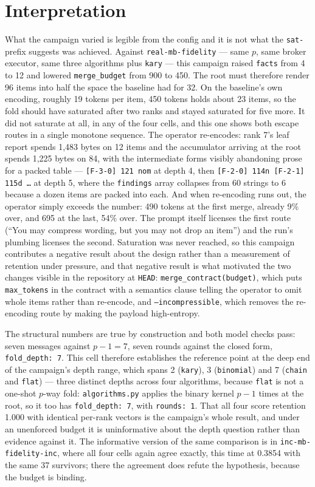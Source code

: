 \documentclass[11pt]{article}
\begin{document}
\section{Interpretation}

What the campaign varied is legible from the config and it is not what the \texttt{sat-}
prefix suggests was achieved. Against \texttt{real-mb-fidelity} --- same $p$, same broker
executor, same three algorithms plus \texttt{kary} --- this campaign raised \texttt{facts}
from 4 to 12 and lowered \texttt{merge\_budget} from 900 to 450. The root must therefore
render 96 items into half the space the baseline had for 32. On the baseline's own
encoding, roughly 19 tokens per item, 450 tokens holds about 23 items, so the fold should
have saturated after two ranks and stayed saturated for five more. It did not saturate at
all, in any of the four cells, and this one shows both escape routes in a single monotone
sequence. The operator re-encodes: rank 7's leaf report spends 1{,}483 bytes on 12 items
and the accumulator arriving at the root spends 1{,}225 bytes on 84, with the intermediate
forms visibly abandoning prose for a packed table --- \texttt{[F-3-0] 121 nom} at depth 4,
then \texttt{[F-2-0] 114n [F-2-1] 115d \dots} at depth 5, where the \texttt{findings} array
collapses from 60 strings to 6 because a dozen items are packed into each. And when
re-encoding runs out, the operator simply exceeds the number: 490 tokens at the first
merge, already 9\% over, and 695 at the last, 54\% over. The prompt itself licenses the
first route (``You may compress wording, but you may not drop an item'') and the run's
plumbing licenses the second. Saturation was never reached, so this campaign contributes a
negative result about the design rather than a measurement of retention under pressure, and
that negative result is what motivated the two changes visible in the repository at
\texttt{HEAD}: \texttt{merge\_contract(budget)}, which puts \texttt{max\_tokens} in the
contract with a semantics clause telling the operator to omit whole items rather than
re-encode, and \texttt{--incompressible}, which removes the re-encoding route by making the
payload high-entropy.

The structural numbers are true by construction and both model checks pass: seven messages
against $p-1 = 7$, seven rounds against the closed form, \texttt{fold\_depth: 7}. This cell
therefore establishes the reference point at the deep end of the campaign's depth range,
which spans 2 (\texttt{kary}), 3 (\texttt{binomial}) and 7 (\texttt{chain} and
\texttt{flat}) --- three distinct depths across four algorithms, because \texttt{flat} is
not a one-shot $p$-way fold: \texttt{algorithms.py} applies the binary kernel $p-1$ times
at the root, so it too has \texttt{fold\_depth: 7}, with \texttt{rounds: 1}. That all four
score retention 1.000 with identical per-rank vectors is the campaign's whole result, and
under an unenforced budget it is uninformative about the depth question rather than
evidence against it. The informative version of the same comparison is in
\texttt{inc-mb-fidelity-inc}, where all four cells again agree exactly, this time at 0.3854
with the same 37 survivors; there the agreement does refute the hypothesis, because the
budget is binding.
\end{document}
